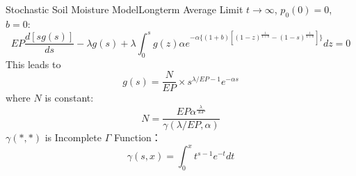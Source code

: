 \documentclass[10pt]{beamer}
\begin{document}
 
\begin{frame}{Stochastic Soil Moisture Model}{Longterm Average}
Limit $t \to \infty$, $p_0(0)=0$, $b=0$:
\begin{equation*} 
\label{main4}
EP\frac{d{[sg(s)]}}{d s}-\lambda g(s)+\lambda \int_{0}^{s} g(z)\alpha e^{-\alpha \{(1+b) [(1-z)^{\frac{1}{1+b}}-(1-s)^{\frac{1}{1+b}} ] \}}dz=0
\end{equation*}
This leads to
\begin{equation*} 
\label{jxj}
g(s)=\frac{N}{EP} \times s^{\lambda / EP -1} e^{-\alpha s}
\end{equation*}
where $N$ is constant:
\begin{equation*} 
\label{normalizationfactor}
N=\frac{EP \alpha ^{\frac{\lambda} {\ EP}}}{\gamma (\lambda /EP , \alpha)}
\end{equation*}
$\gamma(*,*)$ is Incomplete $\Gamma$ Function：
\begin{equation*}
\gamma(s,x)=\int_{0}^{x} t^{s-1}e^{-t}dt
\end{equation*}
\end{frame}
 
\end{document}
